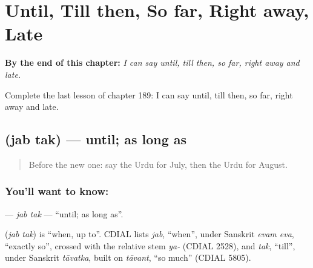 
\chapter{Until, Till then, So far, Right away, Late}
\label{ch:ur-until-till-then-so-far-right-away-late}

\begin{chapteropening}
\textbf{By the end of this chapter:} \emph{I can say until, till then, so far, right away and late.}

Complete the last lesson of chapter 189: I can say until, till then, so far, right away and late.
\end{chapteropening}

\section[\texorpdfstring{\ur{جب} \ur{تک} (jab tak)}{جب تک (jab tak)}]{  (jab tak) — until; as long as}

\label{lesson:UR-C189-jab-tak}



\begin{quote}
Before the new one: say the Urdu for July, then the Urdu for August.
\end{quote}

\subsection*{You'll want to know:  }
\textbf{ } — \emph{jab tak} — \textquotedblleft{}until; as long as\textquotedblright{}.

\begin{cousinweb}
\textbf{ } (\emph{jab tak}) is \textquotedblleft{}when, up to\textquotedblright{}. CDIAL lists \emph{jab}, \textquotedblleft{}when\textquotedblright{}, under Sanskrit \emph{evam eva}, \textquotedblleft{}exactly so\textquotedblright{}, crossed with the relative stem \emph{ya-} (CDIAL 2528), and \emph{tak}, \textquotedblleft{}till\textquotedblright{}, under Sanskrit \emph{tāvatka}, built on \emph{tāvant}, \textquotedblleft{}so much\textquotedblright{} (CDIAL 5805).
\end{cousinweb}

